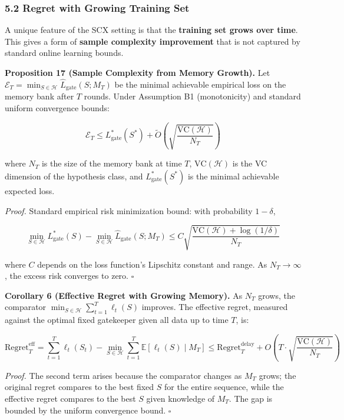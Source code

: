 \documentclass[
  12pt,
]{article}
\begin{document}
\subsubsection{5.2 Regret with Growing Training
Set}\label{regret-with-growing-training-set}

A unique feature of the SCX setting is that the \textbf{training set
grows over time}. This gives a form of \textbf{sample complexity
improvement} that is not captured by standard online learning bounds.

\textbf{Proposition 17 (Sample Complexity from Memory Growth).} Let
\(\mathcal{E}_T = \min_{S \in \mathcal{H}} \hat{L}_{\text{gate}}(S; M_T)\)
be the minimal achievable empirical loss on the memory bank after \(T\)
rounds. Under Assumption B1 (monotonicity) and standard uniform
convergence bounds:

\[\mathcal{E}_T \leq L_{\text{gate}}^*(S^*) + \tilde{O}\left( \sqrt{\frac{\text{VC}(\mathcal{H})}{N_T}} \right)\]

where \(N_T\) is the size of the memory bank at time \(T\),
\(\text{VC}(\mathcal{H})\) is the VC dimension of the hypothesis class,
and \(L_{\text{gate}}^*(S^*)\) is the minimal achievable expected loss.

\emph{Proof.} Standard empirical risk minimization bound: with
probability \(1 - \delta\),

\[\min_{S \in \mathcal{H}} L_{\text{gate}}^*(S) - \min_{S \in \mathcal{H}} \hat{L}_{\text{gate}}(S; M_T) \leq C \sqrt{\frac{\text{VC}(\mathcal{H}) + \log(1/\delta)}{N_T}}\]

where \(C\) depends on the loss function's Lipschitz constant and range.
As \(N_T \to \infty\), the excess risk converges to zero. \(\square\)

\textbf{Corollary 6 (Effective Regret with Growing Memory).} As \(N_T\)
grows, the comparator
\(\min_{S \in \mathcal{H}} \sum_{t=1}^T \ell_t(S)\) improves. The
effective regret, measured against the optimal fixed gatekeeper given
all data up to time \(T\), is:

\[\text{Regret}_T^{\text{eff}} = \sum_{t=1}^T \ell_t(S_t) - \min_{S \in \mathcal{H}} \sum_{t=1}^T \mathbb{E}[\ell_t(S) \mid M_T] \leq \text{Regret}_T^{\text{delay}} + O\left( T \cdot \sqrt{\frac{\text{VC}(\mathcal{H})}{N_T}} \right)\]

\emph{Proof.} The second term arises because the comparator changes as
\(M_T\) grows; the original regret compares to the best fixed \(S\) for
the entire sequence, while the effective regret compares to the best
\(S\) given knowledge of \(M_T\). The gap is bounded by the uniform
convergence bound. \(\square\)
\end{document}
